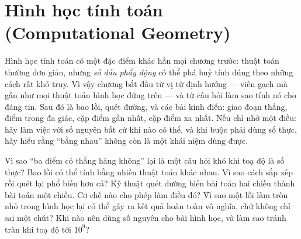 \documentclass[../../algorithm.tex]{subfiles}
\begin{document}
\chapter{Hình học tính toán (Computational Geometry)}

\begin{tomtat}
Hình học tính toán có một đặc điểm khác hẳn mọi chương trước: thuật toán thường đơn giản, nhưng \emph{số dấu phẩy động} có thể phá huỷ tính đúng theo những cách rất khó truy. Vì vậy chương bắt đầu từ vị từ định hướng --- viên gạch mà gần như mọi thuật toán hình học đứng trên --- và từ câu hỏi làm sao tính nó cho đáng tin. Sau đó là bao lồi, quét đường, và các bài kinh điển: giao đoạn thẳng, điểm trong đa giác, cặp điểm gần nhất, cặp điểm xa nhất. Nếu chỉ nhớ một điều: hãy làm việc với số nguyên bất cứ khi nào có thể, và khi buộc phải dùng số thực, hãy hiểu rằng ``bằng nhau'' không còn là một khái niệm dùng được.
\end{tomtat}

\begin{nentang}
\end{nentang}

\begin{khoigoi}
\h{Vì sao ``ba điểm có thẳng hàng không'' lại là một câu hỏi khó khi toạ độ là số thực?}
\h{Bao lồi có thể tính bằng nhiều thuật toán khác nhau. Vì sao cách sắp xếp rồi quét lại phổ biến hơn cả?}
\h{Kỹ thuật quét đường biến bài toán hai chiều thành bài toán một chiều. Cơ chế nào cho phép làm điều đó?}
\h{Vì sao một lỗi làm tròn nhỏ trong hình học lại có thể gây ra kết quả hoàn toàn vô nghĩa, chứ không chỉ sai một chút?}
\h{Khi nào nên dùng số nguyên cho bài hình học, và làm sao tránh tràn khi toạ độ tới \(10^9\)?}
\end{khoigoi}
\end{document}
